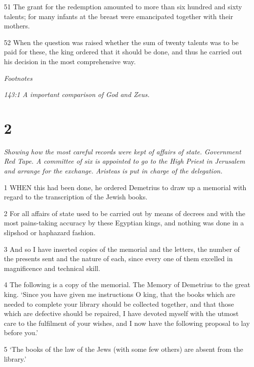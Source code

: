 \par 51 The grant for the redemption amounted to more than six hundred and sixty talents; for many infants at the breast were emancipated together with their mothers.

\par 52 When the question was raised whether the sum of twenty talents was to be paid for these, the king ordered that it should be done, and thus he carried out his decision in the most comprehensive way.

\par \textit{Footnotes}
\par \textit{143:1 A important comparison of God and Zeus.}

\chapter{2}

\par \textit{Showing how the most careful records were kept of affairs of state. Government Red Tape. A committee of six is appointed to go to the High Priest in Jerusalem and arrange for the exchange. Aristeas is put in charge of the delegation.}

\par 1 WHEN this had been done, he ordered Demetrius to draw up a memorial with regard to the transcription of the Jewish books.

\par 2 For all affairs of state used to be carried out by means of decrees and with the most pains-taking accuracy by these Egyptian kings, and nothing was done in a slipshod or haphazard fashion.

\par 3 And so I have inserted copies of the memorial and the letters, the number of the presents sent and the nature of each, since every one of them excelled in magnificence and technical skill.

\par 4 The following is a copy of the memorial. The Memory of Demetrius to the great king. ‘Since you have given me instructions O king, that the books which are needed to complete your library should be collected together, and that those which are defective should be repaired, I have devoted myself with the utmost care to the fulfilment of your wishes, and I now have the following proposal to lay before you.’

\par 5 ‘The books of the law of the Jews (with some few others) are absent from the library.’

